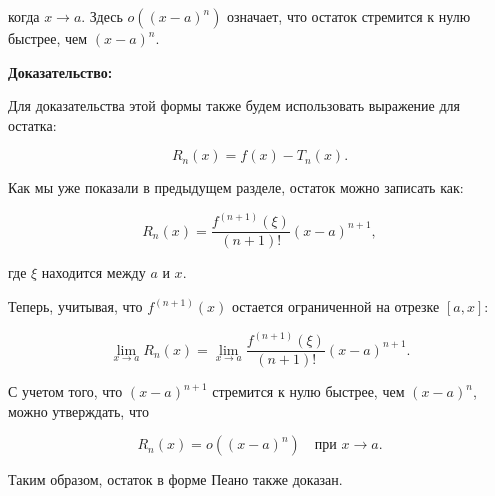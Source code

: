 когда \( x \to a \). Здесь \( o((x-a)^{n}) \) означает, что остаток стремится к нулю быстрее, чем \( (x-a)^{n} \).

\textbf{Доказательство:}

Для доказательства этой формы также будем использовать выражение для остатка:

\[
R_n(x) = f(x) - T_n(x).
\]

Как мы уже показали в предыдущем разделе, остаток можно записать как:

\[
R_n(x) = \frac{f^{(n+1)}(\xi)}{(n+1)!}(x-a)^{n+1},
\]

где \( \xi \) находится между \( a \) и \( x \).

Теперь, учитывая, что \( f^{(n+1)}(x) \) остается ограниченной на отрезке \( [a, x] \):

\[
\lim_{x \to a} R_n(x) = \lim_{x \to a} \frac{f^{(n+1)}(\xi)}{(n+1)!}(x-a)^{n+1}.
\]

С учетом того, что \( (x-a)^{n+1} \) стремится к нулю быстрее, чем \( (x-a)^{n} \), можно утверждать, что 

\[
R_n(x) = o((x-a)^{n}) \quad \text{при } x \to a.
\]

Таким образом, остаток в форме Пеано также доказан.
